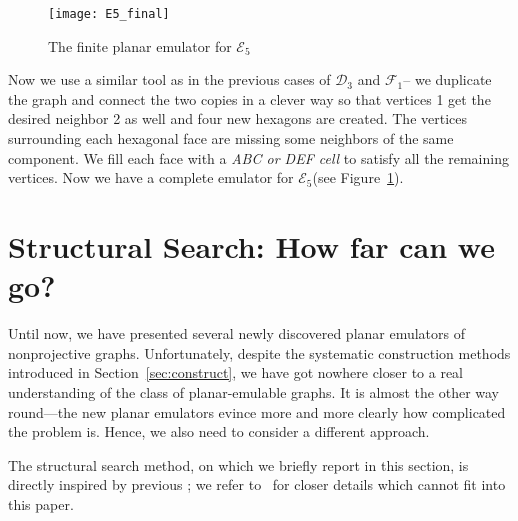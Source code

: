 \documentclass[envcountsect,envcountsame]{llncs}
\renewenvironment{accumulate}{}{}
\newcommand{\DD}{\ensuremath{\mathcal{D}_3}\xspace}
\newcommand{\EEE}{\ensuremath{\mathcal{E}_5}\xspace}
\newcommand{\FF}{\ensuremath{\mathcal{F}_1}\xspace}
\begin{document}
\begin{accumulate}
\begin{figure}[tbp]
\texttt{[image: E5\_final]}
\caption{The finite planar emulator for \EEE}
\label{fig:E5_final}
\end{figure}

Now we use a similar tool as in the previous cases of \DD and \FF -- we
duplicate the graph and connect the two copies in a clever way so that
vertices 1 get the desired neighbor 2 as well and four new hexagons are
created.  The vertices surrounding each hexagonal face are missing some
neighbors of the same component.  We fill each face with a \textit{ABC or
DEF cell} to satisfy all the remaining vertices.  Now we have a complete
emulator for \EEE (see Figure~\ref{fig:E5_final}).




\end{accumulate}






\section{Structural Search: How far can we go?}
\label{sec:algo}
\label{sec:forbminors}


Until now, we have presented several newly discovered planar
emulators of nonprojective graphs.
Unfortunately, despite the systematic construction methods introduced in
Section~\ref{sec:construct}, we have got nowhere closer to
a real understanding of the class of planar-emulable graphs.
It is almost the other way round---the new planar emulators evince 
more and more clearly how complicated the problem is.
Hence, we also need to consider a different approach.

The structural search method, on which we briefly report in this section,
is directly inspired by previous \cite{cit:counterex};
we refer to~\cite{cit:martinbc,cit:florida}
for closer details which cannot fit into this paper.
\end{document}
